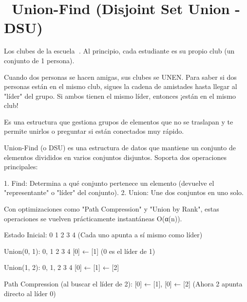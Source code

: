 ﻿\chapter[\emj{🤝}~Union-Find (Disjoint Set Union - DSU)]{~Union-Find (Disjoint Set Union - DSU)}

\begin{dsaquees}

Los clubes de la escuela 🏫. Al principio, cada estudiante es su
propio club (un conjunto de 1 persona). 

Cuando dos personas se hacen amigas, sus clubes se UNEN. Para saber 
si dos personas están en el mismo club, sigues la cadena de amistades
hasta llegar al "líder" del grupo. Si ambos tienen el mismo líder,
entonces ¡están en el mismo club!

Es una estructura que gestiona grupos de elementos que no se 
traslapan y te permite unirlos o preguntar si están conectados 
muy rápido.

\end{dsaquees}

\begin{dsaotraforma}

Union-Find (o DSU) es una estructura de datos que mantiene un 
conjunto de elementos divididos en varios conjuntos disjuntos. 
Soporta dos operaciones principales:

1. Find: Determina a qué conjunto pertenece un elemento (devuelve
   el "representante" o "líder" del conjunto).
2. Union: Une dos conjuntos en uno solo.

Con optimizaciones como "Path Compression" y "Union by Rank", estas
operaciones se vuelven prácticamente instantáneas O(α(n)).

\end{dsaotraforma}

\begin{dsadiagrama}
Estado Inicial: {0} {1} {2} {3} {4}
(Cada uno apunta a sí mismo como líder)

Union(0, 1): {0, 1} {2} {3} {4}
  [0] ← [1] (0 es el líder de 1)

Union(1, 2): {0, 1, 2} {3} {4}
  [0] ← [1] ← [2]

Path Compression (al buscar el líder de 2):
  [0] ← [1], [0] ← [2] (Ahora 2 apunta directo al líder 0)
\end{dsadiagrama}


